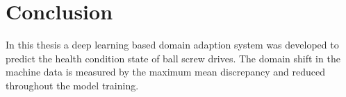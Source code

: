 \chapter{Conclusion}\label{chapter:conclusion}
In this thesis a deep learning based domain adaption system was developed to predict the health condition state of ball screw drives. The domain shift in the machine data is measured by the maximum mean discrepancy and reduced throughout the model training.

